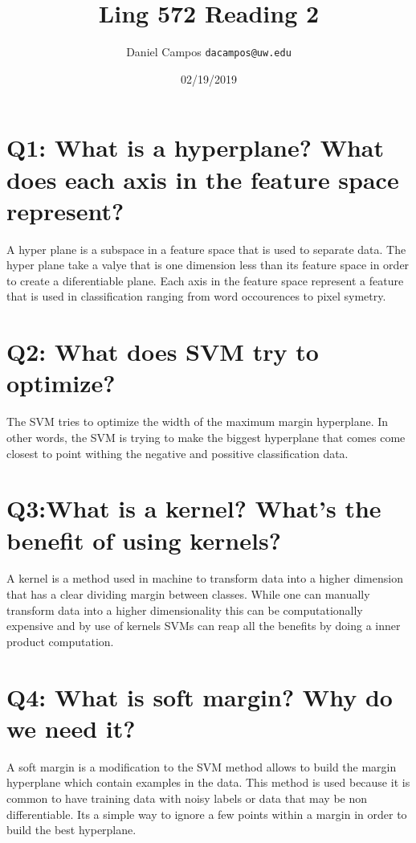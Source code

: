 \documentclass[11pt]{article}
\begin{document}
\title{Ling 572 Reading 2}
\author{Daniel Campos  \tt {dacampos@uw.edu}}
\date{02/19/2019}
\maketitle 
\section{ Q1: What is a hyperplane? What does each axis in the feature space represent? }
A hyper plane is a subspace in a feature space that is used to separate data. The hyper plane take a valye that is one dimension less than its feature space in order to create a diferentiable plane. Each axis in the feature space represent a feature that is used in classification ranging from word occourences to pixel symetry. 
\section{ Q2: What does SVM try to optimize?}
The SVM tries to optimize the width of the maximum margin hyperplane. In other words, the SVM is trying to make the biggest hyperplane that comes come closest to point withing the negative and possitive classification data. 
\section{ Q3:What is a kernel? What’s the benefit of using kernels?}
A kernel is a method used in machine to transform data into a higher dimension that has a clear dividing margin between classes. While one can manually transform data into a higher dimensionality this can be computationally expensive and by use of kernels SVMs can reap all the benefits by doing a inner product computation.
\section{Q4: What is soft margin? Why do we need it?}
A soft margin is a modification to the SVM method allows to build the margin hyperplane which contain examples in the data. This method is used because it is common to have training data with noisy labels or data that may be non differentiable. Its a simple way to ignore a few points within a margin in order to build the best hyperplane.
\end{document}
